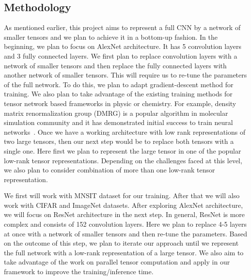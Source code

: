 \documentclass[11pt]{article}
\begin{document}
\subsection{Methodology}
As mentioned earlier, this project aims to represent a full CNN by a network of smaller tensors and we plan to achieve it in a bottom-up fashion. In the beginning, we plan to focus on AlexNet architecture. It has 5 convolution layers and 3 fully connected layers. We first plan to replace convolution layers with a network of smaller tensors and then replace the fully connected layers with another network of smaller tensors. This will require us to re-tune the parameters of the full network. To do this, we plan to adapt gradient-descent method for training. We also plan to take advantage of the existing training methods for tensor network based frameworks in physic or chemistry. For example, density matrix renormalization group (DMRG) is a popular algorithm in molecular simulation community and it has demonstrated initial success to train neural networks~\cite{SS-NIPS2016}. Once we have a working architecture with low rank representations of two large tensors, then our next step would be to replace both tensors with a single one. Here first we plan to represent the large tensor in one of the popular low-rank tensor representations. Depending on the challenges faced at this level, we also plan to consider combination of more than one low-rank tensor representation.    


We first will work with  MNSIT dataset for our training. After that we will also work with CIFAR and ImageNet datasets. After exploring AlexNet architecture, we will focus on ResNet architecture in the next step. In general, ResNet is more complex and consists of 152 convolution layers. Here we plan to replace 4-5 layers at once with a network of smaller tensors and then re-tune the parameters. Based on the outcome of this step, we plan to iterate our approach until we represent the full network with a low-rank representation of a large tensor. We also aim to take advantage of the  work on parallel tensor computation and apply in our framework to improve the training/inference time.

\end{document}
